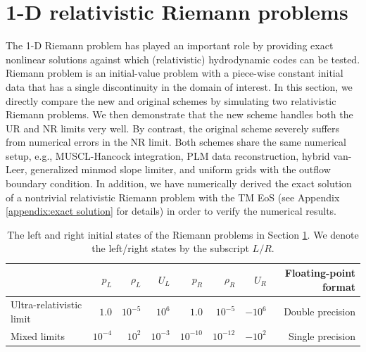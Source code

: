\section{1-D relativistic Riemann problems}
\label{subsec:1-DReletivisticRiemann problems}
The 1-D Riemann problem \citep{SOD1978} has played an important role by providing exact nonlinear solutions against which (relativistic) hydrodynamic codes can be tested. Riemann problem is an initial-value problem with a piece-wise constant initial data that has a single discontinuity in the domain of interest. In this section, we directly compare the new and original schemes by simulating two relativistic Riemann problems. We then demonstrate that the new scheme handles both the UR and NR limits very well. By contrast, the original scheme severely suffers from numerical errors in the NR limit. Both schemes share the same numerical setup, e.g., MUSCL-Hancock integration, PLM data reconstruction, hybrid van-Leer, generalized minmod slope limiter, and uniform grids with the outflow boundary condition. In addition, we have numerically derived the exact solution of a nontrivial relativistic Riemann problem with the TM EoS (see Appendix \ref{appendix:exact solution} for details) in order to verify the numerical results.


\begin{table}[t]
\caption{The left and right initial states of the Riemann problems in Section \ref{subsec:1-DReletivisticRiemann problems}. We denote the left/right states by the subscript $L/R$.}
\label{tb:IC_RiemannProblems}
\begin{tabular}{@{}lrrrrrrr@{}}
\hline
                         & $p_{L}$   & $\rho_{L}$ & $U_{L}$   & $p_{R}$    & $\rho_{R}$ & $U_{R}$   & Floating-point format \\ \hline
Ultra-relativistic limit & $1.0$     & $10^{-5}$  & $10^6$    & $1.0$      & $10^{-5}$  & $-10^{6}$ & Double precision      \\ \hline
Mixed limits             & $10^{-4}$ & $10^{2}$   & $10^{-3}$ & $10^{-10}$ & $10^{-12}$ & $-10^{2}$  & Single precision      \\ \hline
\end{tabular}
\end{table}



